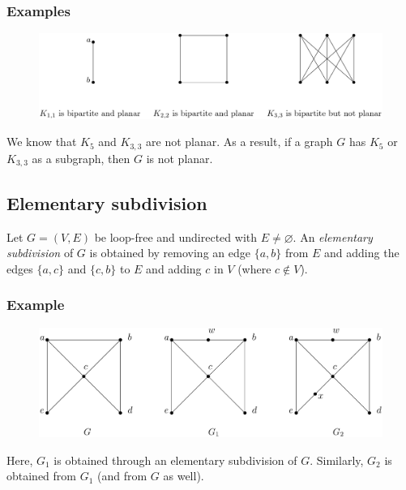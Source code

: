 \documentclass[11pt]{article}
\let\emptyset\varnothing
\begin{document}
    \subsubsection{Examples}

    \begin{figure}[H]
        \centering
        \includegraphics[scale=0.2]{bipartite.png}
    \end{figure}

    We know that \(K_5\) and \(K_{3,3}\) are not planar. As a result, if a graph $G$ has \(K_5\) or \(K_{3,3}\) as a subgraph, then $G$ is not planar.

    \subsection{Elementary subdivision}

    Let \(G = (V,E)\) be loop-free and undirected with \(E \neq \emptyset\). An \emph{elementary subdivision} of $G$ is obtained by removing an edge \(\{a,b\}\) from $E$ and adding the edges \(\{a,c\}\) and \(\{c,b\}\) to $E$ and adding $c$ in $V$ (where \(c \notin V\)). 

    \subsubsection{Example}

    \begin{figure}[H]
        \centering
        \includegraphics[scale=0.2]{elemsub.png}
    \end{figure}

    Here, $G_1$ is obtained through an elementary subdivision of $G$. Similarly, $G_2$ is obtained from $G_1$ (and from $G$ as well). 
\end{document}
